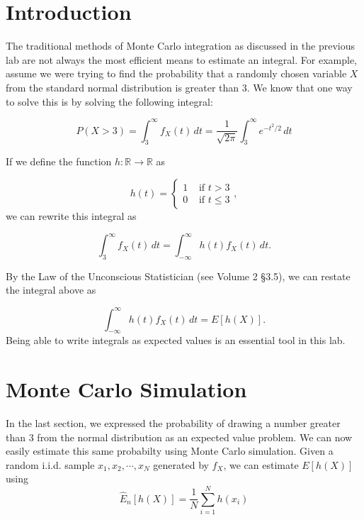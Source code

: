 \label{lab:montecarlo2}

\section*{Introduction} %

The traditional methods of Monte Carlo integration as discussed in the previous lab are not always the most efficient means to estimate an integral. For example, assume we were trying to find the probability that a randomly chosen variable $X$ from the standard normal distribution is greater than $3$. We know that one way to solve this is by solving the following integral:

\begin{equation} \label{eq:integral}
P(X > 3) = \int_{3}^{\infty} f_X(t)\,dt = \frac{1}{\sqrt{2\pi}}\int_{3}^{\infty} e^{-t^2/2}\,dt
\end{equation}

If we define the function $h: \mathbb{R} \rightarrow \mathbb{R}$ as

$$h(t) = \begin{cases}
1 & \text{ if } t > 3 \\
0 & \text{ if } t \leq 3
\end{cases}, $$
we can rewrite this integral as

\begin{equation*}
\int_{3}^{\infty} f_X(t)\,dt = \int_{-\infty}^{\infty} h(t)f_X(t)\,dt.
\end{equation*}

By the Law of the Unconscious Statistician (see Volume 2 \S 3.5), we can restate the integral above as

$$\int_{-\infty}^{\infty} h(t)f_X(t)\,dt = E[h(X)].$$
Being able to write integrals as expected values is an essential tool in this lab.

\section*{Monte Carlo Simulation} %

In the last section, we expressed the probability of drawing a number greater than $3$ from the normal distribution as an expected value problem. We can now easily estimate this same probabilty using Monte Carlo simulation.
Given a random i.i.d. sample $x_1, x_2, \cdots , x_N$ generated by $f_X$, we can estimate $E[h(X)]$ using
\begin{equation} \label{eq:estimator}
\widehat{E}_n[h(X)] = \frac{1}{N}\sum_{i = 1}^{N}h(x_i)
\end{equation}

